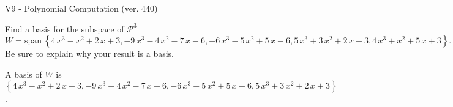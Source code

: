 \begin{exercise}
  \begin{exerciseTitle}V9 - Polynomial Computation (ver. 440)\end{exerciseTitle}
  \begin{exerciseStatement}
    Find a basis for the subspace of \(\mathcal{P}^3\) 
\[W=\mathrm{span}\ \left\{4 \, x^{3} - x^{2} + 2 \, x + 3 , -9 \, x^{3} - 4 \, x^{2} - 7 \, x - 6 , -6 \, x^{3} - 5 \, x^{2} + 5 \, x - 6 , 5 \, x^{3} + 3 \, x^{2} + 2 \, x + 3 , 4 \, x^{3} + x^{2} + 5 \, x + 3\right\}.\]
 Be sure to explain why your result is a basis.


  \end{exerciseStatement}
  \begin{exerciseAnswer}
   A basis of \(W\) is  \(\left\{4 \, x^{3} - x^{2} + 2 \, x + 3 , -9 \, x^{3} - 4 \, x^{2} - 7 \, x - 6 , -6 \, x^{3} - 5 \, x^{2} + 5 \, x - 6 , 5 \, x^{3} + 3 \, x^{2} + 2 \, x + 3\right\}\).
  


  \end{exerciseAnswer}
\end{exercise}